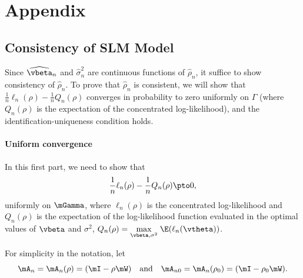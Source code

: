 \documentclass[english,12pt]{book}\usepackage[]{graphicx}\usepackage[]{xcolor}
\begin{document}
\section*{Appendix}
\begin{subappendices}

 \section{Consistency of SLM Model}\label{appendix-consistency}

Since $\widehat{\vbeta}_n$ and $\widehat{\sigma}^2_n$ are continuous functions of $\widehat{\rho}_n$, it suffice to show consistency of $\widehat{\rho}_n$. To prove that $\widehat{\rho}_n$ is consistent, we will show that $\frac{1}{n}\ell_n(\rho) - \frac{1}{n}Q_n(\rho)$ converges in probability to zero uniformly on $\Gamma$ (where $Q_n(\rho)$ is the expectation of the concentrated log-likelihood), and the identification-uniqueness condition holds. 

\paragraph{Uniform convergence}

In this first part, we need to show that
\begin{equation*}
  \frac{1}{n}\ell_n(\rho) - \frac{1}{n}Q_n(\rho) \pto 0,
\end{equation*}
%
uniformly on $\mGamma$, where $\ell_n(\rho)$ is the concentrated log-likelihood and $Q_n(\rho)$ is the expectation of the log-likelihood function evaluated in the optimal values of $\vbeta$ and $\sigma^2$, $Q_n(\rho) = \underset{\vbeta, \sigma^2}{\max}\; \E(\ell_n(\vtheta))$.

For simplicity in the notation, let 
\begin{equation*}
 \mA_n = \mA_n(\rho) = (\mI - \rho\mW) \quad \mbox{and} \quad  \mA_{n0} = \mA_n(\rho_0) = (\mI - \rho_0\mW). 
\end{equation*}


\end{subappendices}
\end{document}
